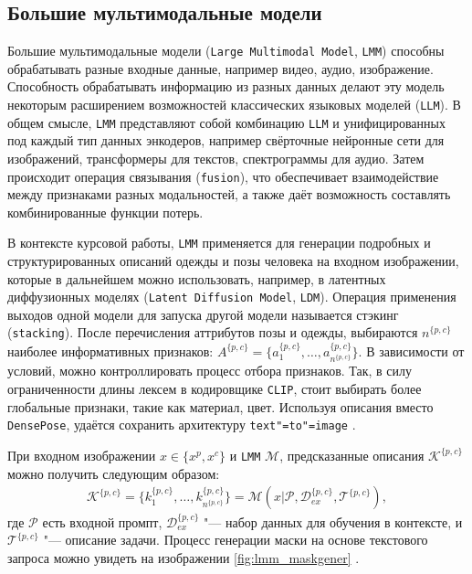 \subsection{Большие мультимодальные модели}
Большие мультимодальные модели (\texttt{Large Multimodal Model}, \texttt{LMM}) способны обрабатывать разные входные данные, например видео, аудио, изображение. Способность обрабатывать информацию из разных данных делают эту модель некоторым расширением возможностей классических языковых моделей (\texttt{LLM}). В общем смысле, \texttt{LMM} представляют собой комбинацию \texttt{LLM} и унифицированных под каждый тип данных энкодеров, например свёрточные нейронные сети для изображений, трансформеры для текстов, спектрограммы для аудио. Затем происходит операция связывания (\texttt{fusion}), что обеспечивает взаимодействие между признаками разных модальностей, а также даёт возможность составлять комбинированные функции потерь.

В контексте курсовой работы, \texttt{LMM} применяется для генерации подробных и структурированных описаний одежды и позы человека на входном изображении, которые в дальнейшем можно использовать, например, в латентных диффузионных моделях (\texttt{Latent Diffusion Model}, \texttt{LDM}). Операция применения выходов одной модели для запуска другой модели называется стэкинг (\texttt{stacking}). После перечисления аттрибутов позы и одежды, выбираются $n^{\{p, c\}}$ наиболее информативных признаков: $A^{\{p, c\}} = \{a_1^{\{p, c\}}, \dots, a_{n^{\{p, c\}}}^{\{p, c\}}\}$. В зависимости от условий, можно контроллировать процесс отбора признаков. Так, в силу ограниченности длины лексем в кодировщике \texttt{CLIP}, стоит выбирать более глобальные признаки, такие как материал, цвет. Используя описания вместо \texttt{DensePose}, удаётся сохранить архитектуру \texttt{text"=to"=image} \cite{promptdresser}.

При входном изображении $x \in \{x^p, x^c\}$ и \texttt{LMM} $\mathcal{M}$, предсказанные описания $\mathcal{K}^{\{p, c\}}$ можно получить следующим образом:
\begin{gather}
    \mathcal{K}^{\{p, c\}} = \{k_1^{\{p, c\}}, \dots, k_{n^{\{p, c\}}}^{\{p, c\}}\} = \mathcal{M}(x|\mathcal{P}, \mathcal{D}_{ex}^{\{p, c\}}, \mathcal{T}^{\{p, c\}}),
\end{gather}
где $\mathcal{P}$ есть входной промпт, $\mathcal{D}_{ex}^{\{p, c\}}$ "--- набор данных для обучения в контексте, и $\mathcal{T}^{\{p, c\}}$ "--- описание задачи. Процесс генерации маски на основе текстового запроса можно увидеть на изображении \ref{fig:lmm_maskgener} \cite{promptdresser}.

